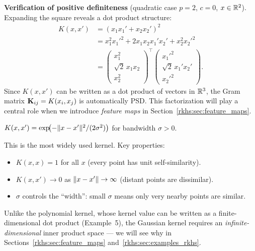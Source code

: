 \begin{notechapter}
\begin{examplebox}
\textbf{Verification of positive definiteness} (quadratic
case $p = 2$, $c = 0$, $x \in \mathbb{R}^2$). Expanding the
square reveals a dot product structure:
\begin{align*}
K(x,x') &= (x_1 x_1' + x_2 x_2')^2 \\
&= x_1^2 {x_1'}^2 + 2 x_1 x_2 x_1' x_2'
  + x_2^2 {x_2'}^2 \\
&= \begin{pmatrix} x_1^2 \\ \sqrt{2}\, x_1 x_2
  \\ x_2^2 \end{pmatrix}^\top
\begin{pmatrix} {x_1'}^2 \\ \sqrt{2}\, x_1' x_2'
  \\ {x_2'}^2 \end{pmatrix}.
\end{align*}
Since $K(x,x')$ can be written as a dot product of
vectors in $\mathbb{R}^3$, the Gram matrix
$\mathbf{K}_{ij} = K(x_i,x_j)$ is automatically PSD.
This factorization will play a central role when we
introduce \emph{feature maps} in
Section~\ref{rkhs:sec:feature_maps}.
\end{examplebox}

\begin{examplebox}
$K(x,x') = \exp\!\bigl(-\| x - x' \|^2 /
(2\sigma^2)\bigr)$ for bandwidth $\sigma > 0$.

This is the most widely used kernel. Key properties:
\begin{itemize}
  \item $K(x,x) = 1$ for all $x$ (every point has
    unit self-similarity).
  \item $K(x,x') \to 0$ as $\| x - x' \| \to \infty$
    (distant points are dissimilar).
  \item $\sigma$ controls the ``width'': small $\sigma$
    means only very nearby points are similar.
\end{itemize}
Unlike the polynomial kernel, whose kernel value can be
written as a finite-dimensional dot product (Example~5),
the Gaussian kernel requires an
\emph{infinite-dimensional} inner product space --- we
will see why in Sections~\ref{rkhs:sec:feature_maps}
and~\ref{rkhs:sec:examples_rkhs}.
\end{examplebox}


\end{notechapter}
